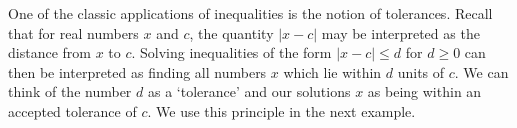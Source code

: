 \medskip


One of the classic applications of inequalities is the notion of tolerances.  Recall that for real numbers $x$ and $c$, the quantity $|x-c|$ may be interpreted as the distance from $x$ to $c$.  Solving inequalities of the form $|x-c| \leq d$ for $d \geq 0$ can then be interpreted as finding all numbers $x$ which lie within $d$ units of $c$.  We can think of the number $d$ as a `tolerance' and our solutions $x$ as being within an accepted tolerance of $c$.  We use this principle in the next example.



\medskip

